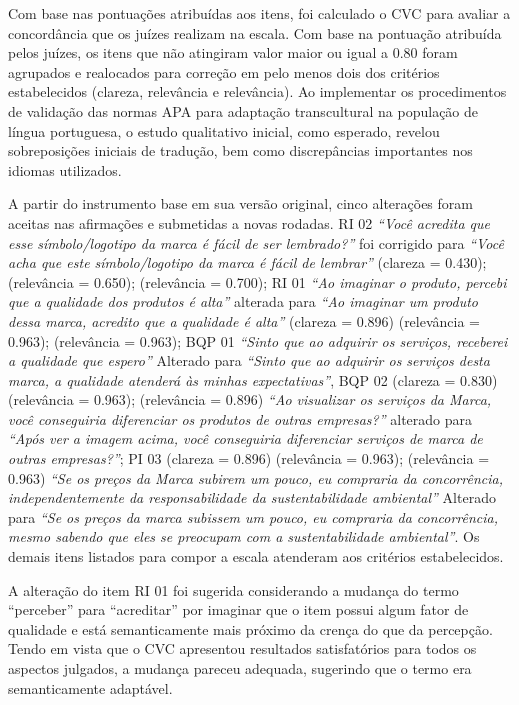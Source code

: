 Com base nas pontuações atribuídas aos itens, foi calculado o CVC para avaliar a concordância que os juízes realizam na escala. Com base na pontuação atribuída pelos juízes, os itens que não atingiram valor maior ou igual a 0.80 foram agrupados e realocados para correção em pelo menos dois dos critérios estabelecidos (clareza, relevância e relevância). Ao implementar os procedimentos de validação das normas APA para adaptação transcultural na população de língua portuguesa, o estudo qualitativo inicial, como esperado, revelou sobreposições iniciais de tradução, bem como discrepâncias importantes nos idiomas utilizados. 

A partir do instrumento base em sua versão original, cinco alterações foram aceitas nas afirmações e submetidas a novas rodadas. RI 02 \textit{“Você acredita que esse símbolo/logotipo da marca é fácil de ser lembrado?”} foi corrigido para \textit{“Você acha que este símbolo/logotipo da marca é fácil de lembrar”} (clareza = 0.430); (relevância = 0.650); (relevância = 0.700); RI 01 \textit{“Ao imaginar o produto, percebi que a qualidade dos produtos é alta”} alterada para \textit{“Ao imaginar um produto dessa marca, acredito que a qualidade é alta”} (clareza = 0.896) (relevância = 0.963); (relevância = 0.963); BQP 01 \textit{“Sinto que ao adquirir os serviços, receberei a qualidade que espero”} Alterado para \textit{“Sinto que ao adquirir os serviços desta marca, a qualidade atenderá às minhas expectativas”}, BQP 02 (clareza = 0.830) (relevância = 0.963); (relevância = 0.896) \textit{“Ao visualizar os serviços da Marca, você conseguiria diferenciar os produtos de outras empresas?”} alterado para \textit{“Após ver a imagem acima, você conseguiria diferenciar serviços de marca de outras empresas?”}; PI 03 (clareza = 0.896) (relevância = 0.963); (relevância = 0.963) \textit{“Se os preços da Marca subirem um pouco, eu compraria da concorrência, independentemente da responsabilidade da sustentabilidade ambiental”} Alterado para \textit{“Se os preços da marca subissem um pouco, eu compraria da concorrência, mesmo sabendo que eles se preocupam com a sustentabilidade ambiental”}. Os demais itens listados para compor a escala atenderam aos critérios estabelecidos.

A alteração do item RI 01 foi sugerida considerando a mudança do termo “perceber” para “acreditar” por imaginar que o item possui algum fator de qualidade e está semanticamente mais próximo da crença do que da percepção. Tendo em vista que o CVC apresentou resultados satisfatórios para todos os aspectos julgados, a mudança pareceu adequada, sugerindo que o termo era semanticamente adaptável.


